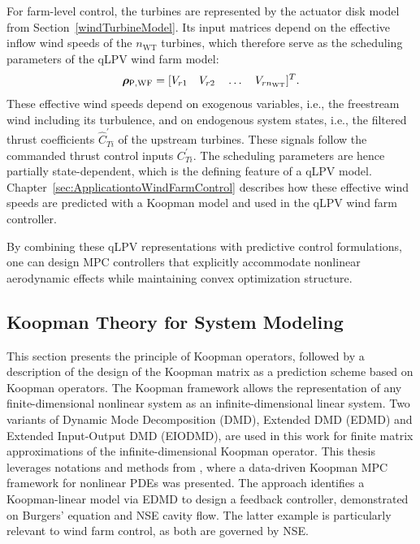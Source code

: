 For farm-level control, the turbines are represented by the actuator disk model from Section~\ref{windTurbineModel}. Its input matrices depend on the effective inflow wind speeds of the $n_{\text{WT}}$ turbines, which therefore serve as the scheduling parameters of the qLPV wind farm model:
\begin{equation} \label{eq:rhoWF}
    \bm{\rho}_{\mathsf{P},\text{WF}} = [V_{r1} \quad V_{r2} \quad \ldots \quad V_{r n_{\text{WT}}}]^T.
\end{equation}
These effective wind speeds depend on exogenous variables, i.e., the freestream wind including its turbulence, and on endogenous system states, i.e., the filtered thrust coefficients $\hat{C}^\prime_{Ti}$ of the upstream turbines. These signals follow the commanded thrust control inputs $C^\prime_{Ti}$. The scheduling parameters are hence partially state-dependent, which is the defining feature of a qLPV model. Chapter~\ref{sec:ApplicationtoWindFarmControl} describes how these effective wind speeds are predicted with a Koopman model and used in the qLPV wind farm controller.

By combining these qLPV representations with predictive control formulations, one can design MPC controllers that explicitly accommodate nonlinear aerodynamic effects while maintaining convex optimization structure. 



\subsection{Koopman Theory for System Modeling} \label{sec:Koopman}

This section presents the principle of Koopman operators, followed by a description of the design of the Koopman matrix as a prediction scheme based on Koopman operators. The Koopman framework allows the representation of any finite-dimensional nonlinear system as an infinite-dimensional linear system. Two variants of Dynamic Mode Decomposition (DMD), Extended DMD (EDMD) and Extended Input-Output DMD (EIODMD), are used in this work for finite matrix approximations of the infinite-dimensional Koopman operator. This thesis leverages notations and methods from \cite{arbabi2018data}, where a data-driven Koopman MPC framework for nonlinear PDEs was presented. The approach identifies a Koopman-linear model via EDMD to design a feedback controller, demonstrated on Burgers’ equation and NSE cavity flow. The latter example is particularly relevant to wind farm control, as both are governed by NSE.

